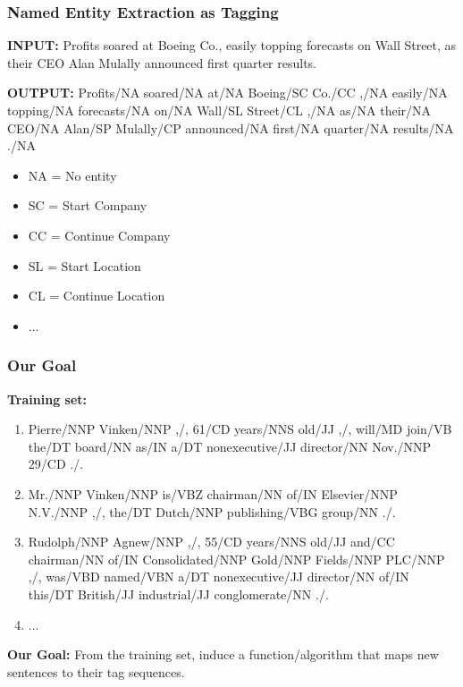 \documentclass[handout]{beamer}
\begin{document}
\begin{frame}
  \frametitle{Named Entity Extraction as Tagging}
  \textbf{INPUT:}
  Profits soared at Boeing Co., easily topping forecasts on Wall Street, as their CEO Alan Mulally announced first quarter results.

  \textbf{OUTPUT:}
  Profits/NA soared/NA at/NA Boeing/SC Co./CC ,/NA easily/NA topping/NA forecasts/NA on/NA Wall/SL Street/CL ,/NA as/NA their/NA CEO/NA Alan/SP Mulally/CP announced/NA first/NA quarter/NA results/NA ./NA

  \begin{itemize}
    \item NA = No entity
    \item SC = Start Company
    \item CC = Continue Company
    \item SL = Start Location
    \item CL = Continue Location
    \item ...
  \end{itemize}
\end{frame}


\begin{frame}
  \frametitle{Our Goal}
  \textbf{Training set:}
  \begin{enumerate}
    \item Pierre/NNP Vinken/NNP ,/, 61/CD years/NNS old/JJ ,/, will/MD join/VB the/DT board/NN as/IN a/DT nonexecutive/JJ director/NN Nov./NNP 29/CD ./.
    \item Mr./NNP Vinken/NNP is/VBZ chairman/NN of/IN Elsevier/NNP N.V./NNP ,/, the/DT Dutch/NNP publishing/VBG group/NN ./.
    \item Rudolph/NNP Agnew/NNP ,/, 55/CD years/NNS old/JJ and/CC chairman/NN of/IN Consolidated/NNP Gold/NNP Fields/NNP PLC/NNP ,/, was/VBD named/VBN a/DT nonexecutive/JJ director/NN of/IN this/DT British/JJ industrial/JJ conglomerate/NN ./.
    \item ...
  \end{enumerate}

  \textbf{Our Goal:} From the training set, induce a function/algorithm that maps new sentences to their tag sequences.
\end{frame}
\end{document}
